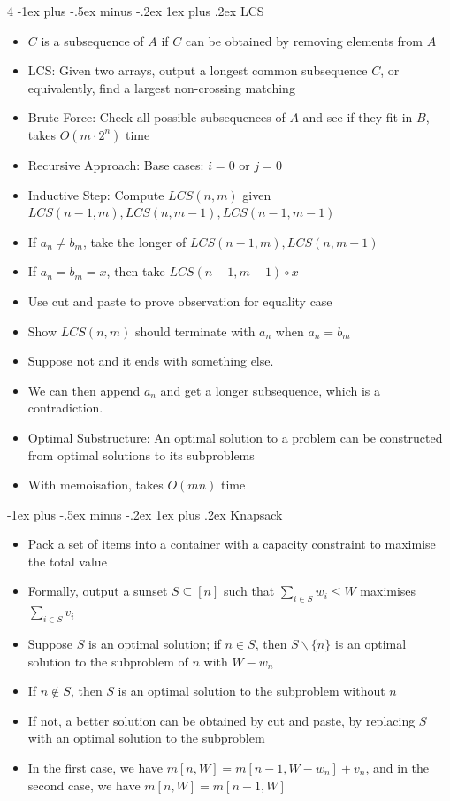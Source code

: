 \documentclass[10pt, landscape]{article}
\makeatletter
\renewcommand{\subsection}{\@startsection{subsection}{3}{0mm}%
                                {-1ex plus -.5ex minus -.2ex}%
                                {1ex plus .2ex}%
                                {\normalfont\small\bfseries}}%
\makeatother
\begin{document}
\begin{multicols*}{4}
\subsection{LCS}
\begin{itemize}
    \item $C$ is a subsequence of $A$ if $C$ can be obtained by removing elements from $A$
    \item LCS: Given two arrays, output a longest common subsequence $C$, or equivalently, find a largest non-crossing matching
    \item Brute Force: Check all possible subsequences of $A$ and see if they fit in $B$, takes $O(m\cdot 2^n)$ time
    \item Recursive Approach: Base cases: $i=0$ or $j=0$
    \item Inductive Step: Compute $LCS(n,m)$ given $LCS(n-1, m), LCS(n, m-1), LCS(n-1, m-1)$
    \item If $a_n \neq b_m$, take the longer of $LCS(n-1, m), LCS(n, m-1)$
    \item If $a_n = b_m =x$, then take $LCS(n-1, m-1) \circ x$
    \item Use cut and paste to prove observation for equality case
    \item Show $LCS(n,m)$ should terminate with $a_n$ when $a_n=b_m$
    \item Suppose not and it ends with something else.
    \item We can then append $a_n$ and get a longer subsequence, which is a contradiction.
    \item Optimal Substructure: An optimal solution to a problem can be constructed from optimal solutions to its subproblems
    \item With memoisation, takes $O(mn)$ time
\end{itemize}

\subsection{Knapsack}
\begin{itemize}
    \item Pack a set of items into a container with a capacity constraint to maximise the total value
    \item Formally, output a sunset $S \subseteq [n]$ such that $\sum_{i \in S}w_i \leq W$ maximises $\sum_{i \in S} v_i$
    \item Suppose $S$ is an optimal solution; if $n \in S$, then $S\backslash\{n\}$ is an optimal solution to the subproblem of $n$ with $W-w_n$
    \item If $n \notin S$, then $S$ is an optimal solution to the subproblem without $n$
    \item If not, a better solution can be obtained by cut and paste, by replacing $S$ with an optimal solution to the subproblem
    \item In the first case, we have $m[n, W]=m[n-1, W-w_n]+v_n$, and in the second case, we have $m[n, W]=m[n-1, W]$
\end{itemize}


\end{multicols*}
\end{document}

